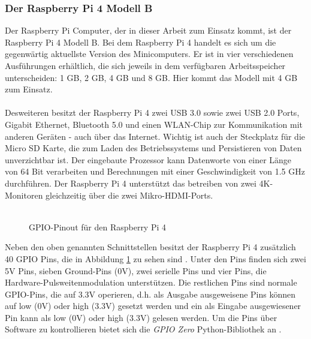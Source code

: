 \subsubsection{Der Raspberry Pi 4 Modell B}
Der Raspberry Pi Computer, der in dieser Arbeit zum Einsatz kommt, ist der Raspberry Pi 4 Modell B. Bei dem Raspberry Pi 4 handelt es sich um die gegenwärtig aktuellste Version des Minicomputers. Er ist in vier verschiedenen Ausführungen erhältlich, die sich jeweils in dem verfügbaren Arbeitsspeicher unterscheiden: 1 \ac{GB}, 2 \ac{GB}, 4 \ac{GB} und 8 \ac{GB}. Hier kommt das Modell mit 4 \ac{GB} zum Einsatz.\\\\
Desweiteren besitzt der Raspberry Pi 4 zwei USB 3.0 sowie zwei USB 2.0 Ports, Gigabit Ethernet, Bluetooth 5.0 und einen WLAN-Chip zur Kommunikation mit anderen Geräten - auch über das Internet. Wichtig ist auch der Steckplatz für die Micro SD Karte, die zum Laden des Betriebssystems und Persistieren von Daten unverzichtbar ist. Der eingebaute Prozessor kann Datenworte von einer Länge von 64 Bit verarbeiten und Berechnungen mit einer Geschwindigkeit von 1.5 \ac{GHz} durchführen. Der Raspberry Pi 4 unterstützt das betreiben von zwei 4K-Monitoren gleichzeitig über die zwei Mikro-HDMI-Ports.\\\\
\begin{figure}[H]
    \centering
    \caption{GPIO-Pinout für den Raspberry Pi 4}
    \label{img:pinout_raspberry}
\end{figure}
\noindent
Neben den oben genannten Schnittstellen besitzt der Raspberry Pi 4 zusätzlich 40 \ac{GPIO} Pins, die in Abbildung \ref{img:pinout_raspberry} zu sehen sind \cite{raspberry_doc}. Unter den Pins finden sich zwei 5V Pins, sieben Ground-Pins (0V), zwei serielle Pins und vier Pins, die Hardware-Pulsweitenmodulation unterstützen. Die restlichen Pins sind normale \ac{GPIO}-Pins, die auf 3.3V operieren, d.h. als Ausgabe ausgeweisene Pins können auf low (0V) oder high (3.3V) gesetzt werden und ein als Eingabe ausgewiesener Pin kann als low (0V) oder high (3.3V) gelesen werden. Um die Pins über Software zu kontrollieren bietet sich die \textit{GPIO Zero} Python-Bibliothek an \cite{gpiozero}. 
